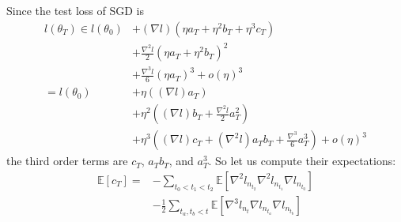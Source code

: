 \documentclass{article}
\newcommand{\expct}[1]{\mathbb{E}\left[#1\right]}
\newcommand{\wrap}[1]{\left(#1\right)}
\begin{document}
            Since the test loss of SGD is
            \begin{align*}
                l(\theta_T)
                \in
                        l(\theta_0)
                &+     (\nabla   l)(\eta a_T + \eta^2 b_T + \eta^3 c_T)                                 \\
                &+\frac{\nabla^2 l}{2}(\eta a_T + \eta^2 b_T             )^2                            \\
                &+\frac{\nabla^3 l}{6}(\eta a_T                          )^3 
                 +o(\eta)^3                                                                             \\
                =
                    l(\theta_0)
                &+  \eta       \wrap{(\nabla l) a_T                               }                     \\
                &+  \eta^2     \wrap{(\nabla l) b_T + \frac{\nabla^2 l}{2} a_T^2  }                     \\
                &+  \eta^3     \wrap{(\nabla l) c_T + (\nabla^2 l) a_T b_T + \frac{\nabla^3}{6} a_T^3}
                 +o(\eta)^3                                                                             
            \end{align*}
            the third order terms are $c_T$, $a_T b_T$, and $a_T^3$.  So let us
            compute their expectations:
            \begin{align*}
                \expct{c_T} =
                   &-\sum_{t_0 < t_1 < t_2} 
                     \expct{\nabla^2 l_{n_{t_2}} \nabla^2 l_{n_{t_1}} \nabla l_{n_{t_0}}}
                   \\
                   &-\frac{1}{2} \sum_{t_a, t_b < t}
                     \expct{\nabla^3 l_{n_t} \nabla l_{n_{t_a}} \nabla l_{n_{t_b}}}
            \end{align*}

    
\end{document}

